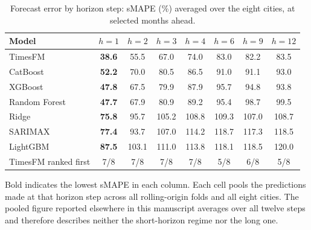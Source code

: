 \begin{table}[htbp]
\centering
\small
\caption{Forecast error by horizon step: sMAPE (\%) averaged over the eight cities, at
selected months ahead.}
\label{tab:horizon}
\begin{tabular}{lccccccc}
\toprule
Model & $h=1$ & $h=2$ & $h=3$ & $h=4$ & $h=6$ & $h=9$ & $h=12$ \\
\midrule
TimesFM & \textbf{38.6} & 55.5 & 67.0 & 74.0 & 83.0 & 82.2 & 83.5 \\
CatBoost & \textbf{52.2} & 70.0 & 80.5 & 86.5 & 91.0 & 91.1 & 93.0 \\
XGBoost & \textbf{47.8} & 67.5 & 79.9 & 87.9 & 95.7 & 94.8 & 93.8 \\
Random Forest & \textbf{47.7} & 67.9 & 80.9 & 89.2 & 95.4 & 98.7 & 99.5 \\
Ridge & \textbf{75.8} & 95.7 & 105.2 & 108.8 & 109.3 & 107.0 & 108.7 \\
SARIMAX & \textbf{77.4} & 93.7 & 107.0 & 114.2 & 118.7 & 117.3 & 118.5 \\
LightGBM & \textbf{87.5} & 103.1 & 111.0 & 113.8 & 118.1 & 118.5 & 120.0 \\
\midrule
TimesFM ranked first & 7/8 & 7/8 & 7/8 & 7/8 & 5/8 & 6/8 & 5/8 \\
\bottomrule
\end{tabular}

\vspace{0.5em}
\begin{minipage}{\textwidth}
\footnotesize
Bold indicates the lowest sMAPE in each column. Each cell pools the predictions made at
that horizon step across all rolling-origin folds and all eight cities. The pooled figure
reported elsewhere in this manuscript averages over all twelve steps and therefore
describes neither the short-horizon regime nor the long one.
\end{minipage}
\end{table}
